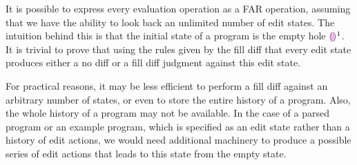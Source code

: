 It is possible to express every evaluation operation as a FAR operation, assuming that we have the ability to look back an unlimited number of edit states. The intuition behind this is that the initial state of a program is the empty hole $\textcolor{violet}{\llparenthesis}\textcolor{violet}{\rrparenthesis}^1$. It is trivial to prove that using the rules given by the fill diff that every edit state produces either a no diff or a fill diff judgment against this edit state.

For practical reasons, it may be less efficient to perform a fill diff against an arbitrary number of states, or even to store the entire history of a program. Also, the whole history of a program may not be available. In the case of a parsed program or an example program, which is specified as an edit state rather than a history of edit actions, we would need additional machinery to produce a possible series of edit actions that leads to this state from the empty state.


